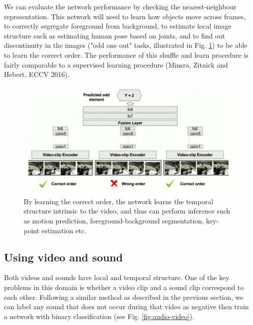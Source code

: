 We can evaluate the network performance by checking the nearest-neighbour representation.
This network will need to learn how objects move across frames, to correctly segregate foreground from background, to estimate local image structure such as estimating human pose based on joints, and to find out discontinuity in the images ("odd one out" tasks, illustrated in Fig. \ref{fig:odd-one}) to be able to learn the correct order.
The performance of this shuffle and learn procedure is fairly comparable to a supervised learning procedure (Minsra, Zitnick and Hebert, ECCV 2016). 
\begin{figure}[H]
  \includegraphics[width=\linewidth]{figs/odd-one-out-network.png}
    \caption{By learning the correct order, the network learns the temporal structure intrinsic to the video, and thus can perform inference such as motion prediction, foreground-background segmentation, key-point estimation etc.}
  \label{fig:odd-one}
\end{figure}


\subsection{Using video and sound}

Both videos and sounds have local and temporal structure. One of the key problems in this domain is whether a video clip and a sound clip correspond to each other. 
Following a similar method as described in the previous section, we can label any sound that does not occur during that video as negative then train a network with binary classification (see Fig. \ref{fig:audio-video}). 


